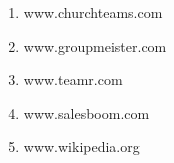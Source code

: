\begin{enumerate}
	\item www.churchteams.com
	\item www.groupmeister.com
	\item www.teamr.com
	\item www.salesboom.com
	\item www.wikipedia.org
\end{enumerate}